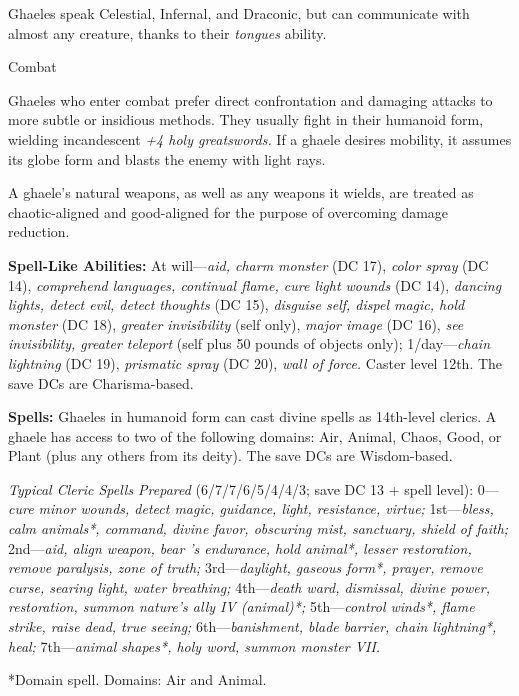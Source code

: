 \documentclass{article}
\begin{document}
Ghaeles speak Celestial, Infernal, and Draconic, but can communicate with almost 
any creature, thanks to their \textit{tongues }ability.

Combat

Ghaeles who enter combat prefer direct confrontation and damaging attacks to more 
subtle or insidious methods. They usually fight in their humanoid form, wielding 
incandescent \textit{+4 holy greatswords. }If a ghaele desires mobility, it assumes 
its globe form and blasts the enemy with light rays.

A ghaele's natural weapons, as well as any weapons it wields, are treated as chaotic-aligned 
and good-aligned for the purpose of overcoming damage reduction.

\textbf{Spell-Like Abilities:} At will---\textit{aid, charm monster }(DC 17), \textit{color 
spray }(DC 14), \textit{comprehend languages, continual flame, cure light wounds 
}(DC 14), \textit{dancing lights, detect evil, detect thoughts }(DC 15), \textit{disguise 
self, dispel magic, hold monster }(DC 18), \textit{greater invisibility }(self 
only), \textit{major image }(DC 16), \textit{see invisibility, greater teleport 
}(self plus 50 pounds of objects only); 1/day---\textit{chain lightning }(DC 19), 
\textit{prismatic spray }(DC 20), \textit{wall of force. }Caster level 12th. The 
save DCs are Charisma-based.

\textbf{Spells:} Ghaeles in humanoid form can cast divine spells as 14th-level 
clerics. A ghaele has access to two of the following domains: Air, Animal, Chaos, 
Good, or Plant (plus any others from its deity). The save DCs are Wisdom-based.

\textit{Typical Cleric Spells Prepared }(6/7/7/6/5/4/4/3; save DC 13 + spell level): 
0---\textit{cure minor wounds, detect magic, guidance, light, resistance, virtue; 
}1st---\textit{bless, calm animals*, command, divine favor, obscuring mist, sanctuary, 
shield of faith; }2nd---\textit{aid, align weapon, bear 's endurance, hold animal*, 
lesser restoration, remove paralysis, zone of truth; }3rd---\textit{daylight, gaseous 
form*, prayer, remove curse, searing light, water breathing; }4th---\textit{death 
ward, dismissal, divine power, restoration, summon nature's ally IV (animal)*; 
}5th---\textit{control winds*, flame strike, raise dead, true seeing; }6th---\textit{banishment, 
blade barrier, chain lightning*, heal; }7th---\textit{animal shapes*, holy word, 
summon monster VII.}

*Domain spell. Domains: Air and Animal.
\end{document}
